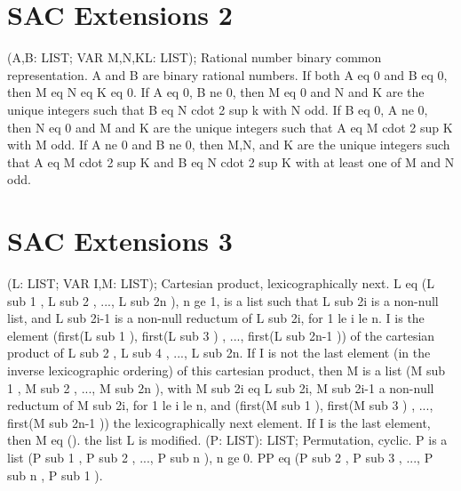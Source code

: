 \section{ SAC Extensions 2  } 
 (A,B: LIST; VAR M,N,KL: LIST); \eproc
\bcom Rational number binary common representation. A and B are binary
rational numbers.  If both A eq 0 and B eq 0, then M eq N eq K eq 0.
If A eq 0, B ne 0, then M eq 0 and N and K are the unique integers
such that B eq N cdot 2 sup k with N odd.  If B eq 0, A ne 0, then
N eq 0 and M and K are the unique integers such that A eq
M cdot 2 sup K with M odd.  If A ne 0 and B ne 0, then M,N, and K
are the unique integers such that A eq M cdot 2 sup K and
B eq N cdot 2 sup K with at least one of M and N odd. \ecom 
\section{ SAC Extensions 3  } 
 (L: LIST; VAR I,M: LIST); \eproc
\bcom Cartesian product, lexicographically next. L eq (L sub 1 , L sub 2
, ..., L sub 2n ), n ge 1, is a list such that L sub 2i is a
non-null list, and L sub 2i-1 is a non-null reductum of L sub 2i,
for 1 le i le n.  I is the element (first(L sub 1 ), first(L sub 3 )
, ..., first(L sub 2n-1 )) of the cartesian product of L sub 2 ,
L sub 4 , ..., L sub 2n.  If I is not the last element
(in the inverse lexicographic ordering)
of this cartesian product, then M is a list (M sub 1 ,
M sub 2 , ..., M sub 2n ), with M sub 2i eq L sub 2i,
M sub 2i-1 a non-null reductum of M sub 2i, for 1 le i le n,
and (first(M sub 1 ), first(M sub 3 ) , ..., first(M sub 2n-1 ))
the lexicographically next element.  If I is the
last element, then M eq (). the list L is modified. \ecom 
{} (P: LIST): LIST; \eproc
\bcom Permutation, cyclic. P is a list (P sub 1 , P sub 2 , ...,
P sub n ), n ge 0.  PP eq (P sub 2 , P sub 3 , ..., P sub n ,
P sub 1 ). \ecom 
